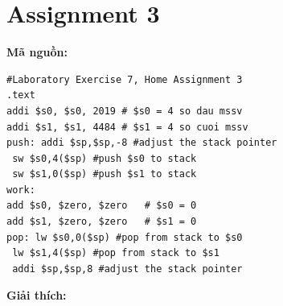 \documentclass[12pt,a4paper,oneside]{article}
\begin{document}
\section*{Assignment 3}
\textbf{Mã nguồn:}
\begin{center}
\begin{lstlisting}
#Laboratory Exercise 7, Home Assignment 3
.text
addi $s0, $s0, 2019	# $s0 = 4 so dau mssv
addi $s1, $s1, 4484	# $s1 = 4 so cuoi mssv
push: addi $sp,$sp,-8 #adjust the stack pointer
 sw $s0,4($sp) #push $s0 to stack
 sw $s1,0($sp) #push $s1 to stack
work: 
add $s0, $zero, $zero	# $s0 = 0
add $s1, $zero, $zero	# $s1 = 0
pop: lw $s0,0($sp) #pop from stack to $s0
 lw $s1,4($sp) #pop from stack to $s1
 addi $sp,$sp,8 #adjust the stack pointer
\end{lstlisting}
\end{center}
\textbf{Giải thích:}
\end{document}
